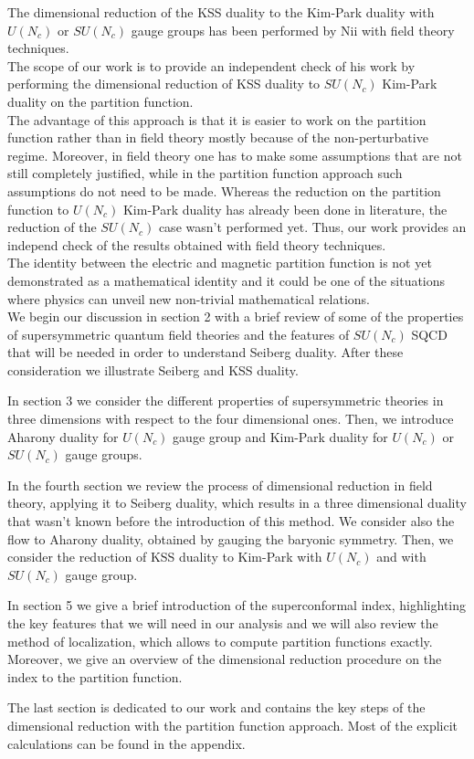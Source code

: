The dimensional reduction of the KSS duality to the Kim-Park duality with $U(N_c)$ or $SU(N_c)$ gauge groups has been performed by Nii with field theory techniques.\\
The scope of our work is to provide an independent check of his work by performing the dimensional reduction of KSS duality to $SU(N_c)$ Kim-Park duality on the partition function.\\
The advantage of this approach is that it is easier to work on the partition function rather than in field theory mostly because of the non-perturbative regime.
Moreover, in field theory one has to make some assumptions that are not still completely justified, while in the partition function approach such assumptions do not need to be made.
Whereas the reduction on the partition function to $U(N_c)$ Kim-Park duality has already been done in literature, the reduction of the $SU(N_c)$ case wasn't performed yet.
Thus, our work provides an independ check of the results obtained with field theory techniques.\\
The identity between the electric and magnetic partition function is not yet demonstrated as a mathematical identity and it could be one of the situations where physics can unveil new non-trivial mathematical relations. 
\\

\pagestyle{intro}
We begin our discussion in section 2 with a brief review of some of the properties of supersymmetric quantum field theories and the features of $SU(N_c)$ SQCD that will be needed in order to understand Seiberg duality.
After these consideration we illustrate Seiberg and KSS duality.
\thispagestyle{intro}

In section 3 we consider the different properties of supersymmetric theories in three dimensions with respect to the four dimensional ones.
Then, we introduce Aharony duality for $U(N_c)$ gauge group and Kim-Park duality for $U(N_c)$ or $SU(N_c)$ gauge groups.

In the fourth section we review the process of dimensional reduction in field theory, applying it to Seiberg duality, which results in a three dimensional duality that wasn't known before the introduction of this method. 
We  consider also the flow to Aharony duality, obtained by gauging the baryonic symmetry.
Then, we consider the reduction of KSS duality to Kim-Park with $U(N_c)$ and with $SU(N_c)$ gauge group.

In section 5 we give a brief introduction of the superconformal index, highlighting the key features that we will need in our analysis and we will also review the method of localization, which allows to compute partition functions exactly.
Moreover, we give an overview of the dimensional reduction procedure on the index to the partition function.

The last section is dedicated to our work and contains the key steps of the dimensional reduction with the partition function approach. 
Most of the explicit calculations can be found in the appendix.



